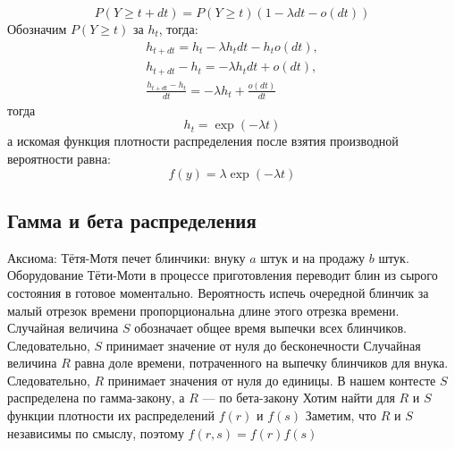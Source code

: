 \documentclass[12pt]{article} %
\theoremstyle{definition} %
\begin{document}

\[
    P(Y \geq t + dt) = P(Y \geq t)(1 - \lambda dt - o(dt))
\]
Обозначим $P(Y \geq t)$ за $h_t$, тогда:
\begin{eqnarray*}
    h_{t + dt} = h_t - \lambda h_t dt - h_t o(dt),\\
    h_{t + dt} - h_t = - \lambda h_t dt + o(dt),\\
    \frac{h_{t + dt} - h_t}{dt} = - \lambda h_t + \frac{o(dt)}{dt}
\end{eqnarray*}
тогда
\[
    h_t = \exp(- \lambda t)
\]
а искомая функция плотности распределения после взятия производной вероятности равна:
\[
    f(y) = \lambda \exp(- \lambda t)
\]


\subsection{Гамма и бета распределения}
Аксиома: Тётя-Мотя печет блинчики: внуку $a$ штук и на продажу $b$ штук. Оборудование Тёти-Моти в процессе приготовления переводит блин из сырого состояния в готовое моментально. Вероятность испечь очередной блинчик за малый отрезок времени пропорциональна длине этого отрезка времени.
Случайная величина $S$ обозначает общее время выпечки всех блинчиков. Следовательно, $S$ принимает значение от нуля до бесконечности
Случайная величина $R$ равна доле времени, потраченного на выпечку блинчиков для внука. Следовательно, $R$ принимает значения от нуля до единицы.
В нашем контесте $S$ распределена по гамма-закону, а $R$ — по бета-закону
Хотим найти для $R$ и $S$ функции плотности их распределений $f(r)$ и $f(s)$
Заметим, что $R$ и $S$ независимы по смыслу, поэтому
$f(r,s) = f(r) f(s)$\\
\end{document}
